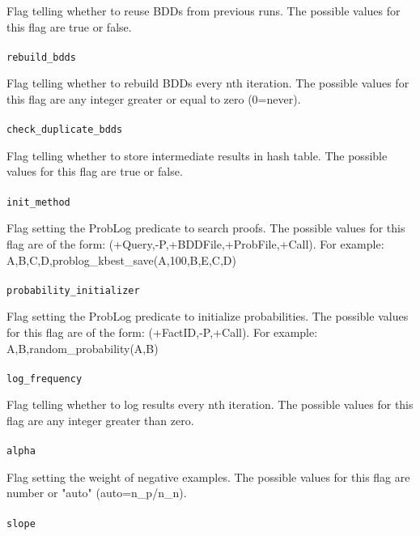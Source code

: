 \documentclass[a4paper,12pt]{article}
\begin{document}
Flag telling whether to reuse BDDs from previous runs.
The possible values for this flag are true or false.
\paragraph{}
\texttt{rebuild\_bdds}

Flag telling whether to rebuild BDDs every nth iteration.
The possible values for this flag are any integer greater or equal to zero (0=never).
\paragraph{}
\texttt{check\_duplicate\_bdds}

Flag telling whether to store intermediate results in hash table.
The possible values for this flag are true or false.
\paragraph{}
\texttt{init\_method}

Flag setting the ProbLog predicate to search proofs.
The possible values for this flag are of the form: (+Query,-P,+BDDFile,+ProbFile,+Call). For example: A,B,C,D,problog\_kbest\_save(A,100,B,E,C,D) 
\paragraph{}
\texttt{probability\_initializer}

Flag setting the ProbLog predicate to initialize probabilities.
The possible values for this flag are of the form: (+FactID,-P,+Call). For example: A,B,random\_probability(A,B) 
\paragraph{}
\texttt{log\_frequency}

Flag telling whether to log results every nth iteration.
The possible values for this flag are any integer greater than zero.
\paragraph{}
\texttt{alpha}

Flag setting the weight of negative examples. 
The possible values for this flag are number or "auto" (auto=n\_p/n\_n).
\paragraph{}
\texttt{slope}
\end{document}
